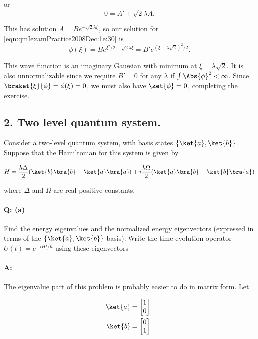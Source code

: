 or
\begin{equation}\label{eqn:qmIexamPractice2008Dec:1e:60}
0 = A' + \sqrt{2} \lambda A.
\end{equation}

This has solution $A = B e^{-\sqrt{2} \lambda \xi}$, so our solution for \ref{eqn:qmIexamPractice2008Dec:1e:30} is
\begin{equation}\label{eqn:qmIexamPractice2008Dec:1e:70}
\phi(\xi) = B e^{\xi^2/2 - \sqrt{2} \lambda \xi} 
= B' e^{ (\xi - \lambda \sqrt{2} )^2/2}.
\end{equation}

This wave function is an imaginary Gaussian with minimum at $\xi = \lambda\sqrt{2}$.  It is also unnormalizable since we require $B' = 0$ for any $\lambda$ if $\int \Abs{\phi}^2 < \infty$.  Since $\braket{\xi}{\phi} = \phi(\xi) = 0$, we must also have $\ket{\phi} = 0$, completing the exercise.

\subsection{2.  Two level quantum system.}

Consider a two-level quantum system, with basis states $\{\ket{a}, \ket{b}\}$.  Suppose that the Hamiltonian for this system is given by

\begin{equation}\label{eqn:qmIexamPractice2008Dec:2:10}
H = 
\frac{\hbar \Delta}{2} ( 
\ket{b}\bra{b}
- \ket{a}\bra{a}
)
+ i \frac{\hbar \Omega}{2} ( 
\ket{a}\bra{b}
- \ket{b}\bra{a}
)
\end{equation}

where $\Delta$ and $\Omega$ are real positive constants.

\paragraph{Q: (a)} Find the energy eigenvalues and the normalized energy eigenvectors (expressed in terms of the $\{\ket{a}, \ket{b}\}$ basis).  Write the time evolution operator $U(t) = e^{-i H t/\hbar}$ using these eigenvectors.

\paragraph{A:}

The eigenvalue part of this problem is probably easier to do in matrix form.  Let 

\begin{align}\label{eqn:qmIexamPractice2008Dec:2:20}
\ket{a} &= 
\begin{bmatrix}
1 \\
0
\end{bmatrix} \\
\ket{b} &= 
\begin{bmatrix}
0 \\
1
\end{bmatrix}.
\end{align}

